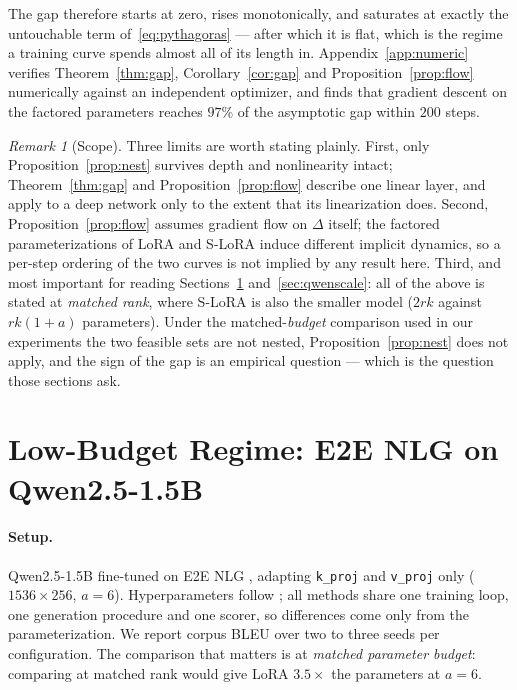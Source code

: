 \documentclass{article}
\theoremstyle{remark}
\newtheorem{remark}[theorem]{Remark}
\begin{document}
The gap therefore starts at zero, rises monotonically, and saturates at exactly
the untouchable term of~\eqref{eq:pythagoras} --- after
which it is flat, which is the regime a training curve spends almost all of its
length in. Appendix~\ref{app:numeric} verifies Theorem~\ref{thm:gap},
Corollary~\ref{cor:gap} and Proposition~\ref{prop:flow} numerically against an
independent optimizer, and finds that gradient descent on the factored
parameters reaches $97\%$ of the asymptotic gap within $200$ steps.

\begin{remark}[Scope]\label{rem:scope}
Three limits are worth stating plainly. First, only
Proposition~\ref{prop:nest} survives depth and nonlinearity intact;
Theorem~\ref{thm:gap} and Proposition~\ref{prop:flow} describe one linear layer,
and apply to a deep network only to the extent that its linearization does.
Second, Proposition~\ref{prop:flow} assumes gradient flow on $\Delta$ itself;
the factored parameterizations of LoRA and S-LoRA induce different implicit
dynamics, so a per-step ordering of the two curves is not implied by any result
here. Third, and most important for reading Sections~\ref{sec:e2e}
and~\ref{sec:qwenscale}: all of the above is stated at \emph{matched rank},
where S-LoRA is also the smaller model ($2rk$ against $rk(1+a)$ parameters).
Under the matched-\emph{budget} comparison used in our experiments the two
feasible sets are not nested, Proposition~\ref{prop:nest} does not apply, and
the sign of the gap is an empirical question --- which is the question those
sections ask.
\end{remark}

\section{Low-Budget Regime: E2E NLG on Qwen2.5-1.5B}
\label{sec:e2e}

\paragraph{Setup.}
Qwen2.5-1.5B \citep{qwen2024qwen25} fine-tuned on E2E NLG
\citep{novikova2017e2e}, adapting \texttt{k\_proj} and \texttt{v\_proj} only
($1536\times 256$, $a=6$). Hyperparameters follow \citet{hu2022lora}; all
methods share one training loop, one generation procedure and one scorer, so
differences come only from the parameterization. We report corpus BLEU
\citep{papineni2002bleu} over two to three seeds per configuration. The
comparison that matters is at \emph{matched parameter budget}: comparing at
matched rank would give LoRA $3.5\times$ the parameters at $a=6$.
\end{document}
